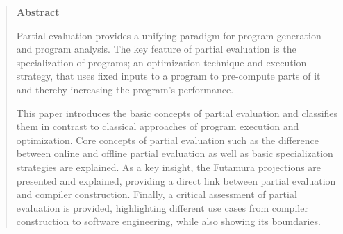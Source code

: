 
\thispagestyle{empty}
\begin{quote}
  \vspace*{4cm}

  \begin{center}
    \textbf{\Large\sffamily Abstract}
  \end{center}

  \vspace{1em}

  Partial evaluation provides a unifying paradigm for program generation and program analysis.
  The key feature of partial evaluation is the specialization of programs; an optimization technique and execution strategy, that uses fixed inputs to a program to pre-compute parts of it and thereby increasing the program's performance.

  This paper introduces the basic concepts of partial evaluation and classifies them in contrast to classical approaches of program execution and optimization.
  Core concepts of partial evaluation such as the difference between online and offline partial evaluation as well as basic specialization strategies are explained.
  As a key insight, the Futamura projections are presented and explained, providing a direct link between partial evaluation and compiler construction.
  Finally, a critical assessment of partial evaluation is provided, highlighting different use cases from compiler construction to software engineering, while also showing its boundaries.
\end{quote}



